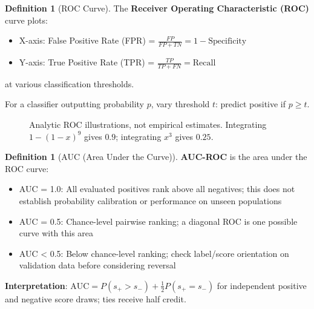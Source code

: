 \documentclass[11pt,twoside]{article}
\numberwithin{equation}{section}
\theoremstyle{plain}
\theoremstyle{definition}
\newtheorem{definition}[theorem]{Definition}
\theoremstyle{remark}
\begin{document}
\begin{definition}[ROC Curve]
The \textbf{Receiver Operating Characteristic (ROC)} curve plots:
\begin{itemize}
\item X-axis: False Positive Rate (FPR) = $\frac{FP}{FP + TN} = 1 - \text{Specificity}$
\item Y-axis: True Positive Rate (TPR) = $\frac{TP}{TP + FN} = \text{Recall}$
\end{itemize}
at various classification thresholds.

For a classifier outputting probability $p$, vary threshold $t$: predict positive if $p \geq t$.
\end{definition}

\begin{figure}[H]
\centering
{}
\caption{Analytic ROC illustrations, not empirical estimates. Integrating $1-(1-x)^9$ gives $0.9$; integrating $x^3$ gives $0.25$.}
\end{figure}

\begin{definition}[AUC (Area Under the Curve)]
\textbf{AUC-ROC} is the area under the ROC curve:
\begin{itemize}
\item AUC = 1.0: All evaluated positives rank above all negatives; this does not establish probability calibration or performance on unseen populations
\item AUC = 0.5: Chance-level pairwise ranking; a diagonal ROC is one possible curve with this area
\item AUC < 0.5: Below chance-level ranking; check label/score orientation on validation data before considering reversal
\end{itemize}

\textbf{Interpretation}: $\mathrm{AUC}=P(s_+>s_-)+\tfrac12P(s_+=s_-)$ for independent positive and negative score draws; ties receive half credit.
\end{definition}
\end{document}
